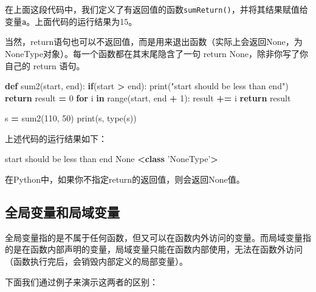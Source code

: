 \documentclass[]{ctexbook}
\newenvironment{Shaded}{\begin{snugshade}}{\end{snugshade}}
\newcommand{\BuiltInTok}[1]{#1}
\newcommand{\ControlFlowTok}[1]{\textcolor[rgb]{0.13,0.29,0.53}{\textbf{#1}}}
\newcommand{\DecValTok}[1]{\textcolor[rgb]{0.00,0.00,0.81}{#1}}
\newcommand{\KeywordTok}[1]{\textcolor[rgb]{0.13,0.29,0.53}{\textbf{#1}}}
\newcommand{\NormalTok}[1]{#1}
\newcommand{\OperatorTok}[1]{\textcolor[rgb]{0.81,0.36,0.00}{\textbf{#1}}}
\newcommand{\StringTok}[1]{\textcolor[rgb]{0.31,0.60,0.02}{#1}}
\newcommand{\VariableTok}[1]{\textcolor[rgb]{0.00,0.00,0.00}{#1}}
\begin{document}
在上面这段代码中，我们定义了有返回值的函数\texttt{sumReturn()}，并将其结果赋值给变量\texttt{a}。上面代码的运行结果为15。

当然，return语句也可以不返回值，而是用来退出函数（实际上会返回None，为NoneType对象）。每一个函数都在其末尾隐含了一句 return None，除非你写了你自己的 return 语句。

\begin{Shaded}
\begin{Highlighting}[]
\KeywordTok{def}\NormalTok{ sum2(start, end):}
    \ControlFlowTok{if}\NormalTok{(start }\OperatorTok{>}\NormalTok{ end):}
        \BuiltInTok{print}\NormalTok{(}\StringTok{"start should be less than end"}\NormalTok{)}
        \ControlFlowTok{return}
\NormalTok{    result }\OperatorTok{=} \DecValTok{0}
    \ControlFlowTok{for}\NormalTok{ i }\KeywordTok{in} \BuiltInTok{range}\NormalTok{(start, end }\OperatorTok{+} \DecValTok{1}\NormalTok{):}
\NormalTok{        result }\OperatorTok{+=}\NormalTok{ i}
    \ControlFlowTok{return}\NormalTok{ result}

\NormalTok{s }\OperatorTok{=}\NormalTok{ sum2(}\DecValTok{110}\NormalTok{, }\DecValTok{50}\NormalTok{)}
\BuiltInTok{print}\NormalTok{(s, }\BuiltInTok{type}\NormalTok{(s))}
\end{Highlighting}
\end{Shaded}

上述代码的运行结果如下：

\begin{Shaded}
\begin{Highlighting}[]
\NormalTok{start should be less than end}
\VariableTok{None} \OperatorTok{<}\KeywordTok{class} \StringTok{'NoneType'}\OperatorTok{>}
\end{Highlighting}
\end{Shaded}

在Python中，如果你不指定return的返回值，则会返回None值。

\hypertarget{ux5168ux5c40ux53d8ux91cfux548cux5c40ux57dfux53d8ux91cf}{%
\subsection{全局变量和局域变量}\label{ux5168ux5c40ux53d8ux91cfux548cux5c40ux57dfux53d8ux91cf}}

全局变量指的是不属于任何函数，但又可以在函数内外访问的变量。而局域变量指的是在函数内部声明的变量，局域变量只能在函数内部使用，无法在函数外访问（函数执行完后，会销毁内部定义的局部变量）。

下面我们通过例子来演示这两者的区别：
\end{document}
